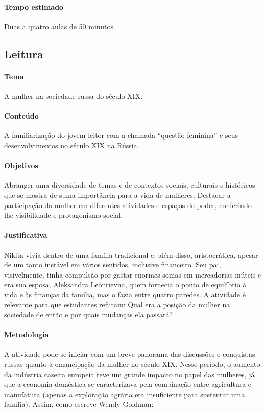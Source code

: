 \documentclass{article}
\begin{document}
\paragraph{Tempo estimado} Duas a quatro aulas de 50 minutos.


\subsection{Leitura}

\paragraph{Tema} A mulher na sociedade russa do século XIX.


\paragraph{Conteúdo}
A familiarização do jovem leitor com a chamada ``questão feminina'' e
seus desenvolvimentos no século XIX na Rússia.

\paragraph{Objetivos}
Abranger uma diversidade de temas e de contextos sociais, culturais e
históricos que se mostra de suma importância para a vida de mulheres.
Destacar a participação da mulher em diferentes atividades e espaços de
poder, conferindo-lhe visibilidade e protagonismo social.

\paragraph{Justificativa}
Nikita vivia dentro de uma família tradicional e, além disso,
aristocrática, apesar de um tanto instável em vários sentidos, inclusive
financeiro. Seu pai, visivelmente, tinha compulsão por gastar enormes
somas em mercadorias inúteis e era sua esposa, Aleksandra Leóntievna,
quem fornecia o ponto de equilíbrio à vida e às finanças da família, mas
o fazia entre quatro paredes. A atividade é relevante para que
estudantes reflitam: Qual era a posição da mulher na sociedade de então
e por quais mudanças ela passará?

\paragraph{Metodologia}
A atividade pode se iniciar com um breve panorama das discussões e
conquistas russas quanto à emancipação da mulher no século XIX. Nesse
período, o aumento da indústria caseira europeia teve um grande impacto
no papel das mulheres, já que a economia doméstica se caracterizava pela
combinação entre agricultura e manufatura (apenas a exploração agrária
era insuficiente para sustentar uma família). Assim, como escreve Wendy
Goldman:
\end{document}
